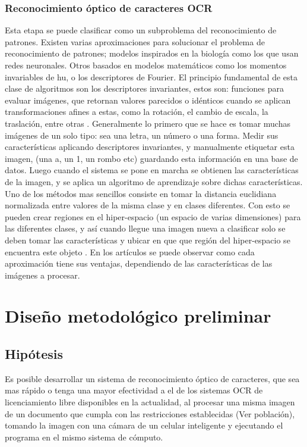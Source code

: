 \documentclass[a4paper, 11pt, oneside]{article}
\begin{document}
	\subsubsection{Reconocimiento óptico de caracteres OCR}
	Esta etapa se puede clasificar como un subproblema del reconocimiento de patrones.\newline
	Existen varias aproximaciones para solucionar el problema de reconocimiento de patrones; 
	modelos inspirados en la biología como los que usan redes neuronales\cite{im_biology}. Otros
	basados en modelos matemáticos como los momentos invariables de hu\cite{art_hu}, o los
	descriptores de Fourier. El principio fundamental de esta clase de algoritmos son
	los descriptores invariantes, estos son: funciones para evaluar imágenes, que retornan valores 
	parecidos o idénticos cuando se aplican	transformaciones afines a estas, como la rotación,
	el cambio de escala, la traslación, entre otras \cite{ocrs1}.\newline	
	Generalmente lo primero que se hace es tomar muchas imágenes de un solo tipo: sea una letra, un 
	número o una forma. Medir sus características aplicando descriptores invariantes, y manualmente 
    etiquetar esta imagen, (una a, un 1, un rombo etc) guardando esta información en una base de
    datos. \newline	
	Luego cuando el sistema se pone en marcha se obtienen las características de la imagen, y se
	aplica un algoritmo de aprendizaje sobre dichas características. Uno de los métodos mas
	sencillos consiste en tomar la distancia euclidiana normalizada entre valores de la misma
	clase y en clases diferentes. Con esto se pueden crear regiones en el hiper-espacio (un
	espacio de varias dimensiones) para las diferentes clases, y así cuando llegue una imagen
	nueva a clasificar solo se deben tomar las características y ubicar en que que región del
	hiper-espacio se encuentra este objeto \cite{learn1}. En los artículos se puede observar como  
	cada aproximación tiene sus ventajas, dependiendo de las características de las imágenes a
	procesar.
	\newpage
		
	\section{Diseño metodológico preliminar}
	
	\subsection{Hipótesis}
	Es posible desarrollar un sistema de reconocimiento óptico de caracteres, que sea mas rápido o
	tenga una mayor efectividad a el de los sistemas OCR de licenciamiento libre disponibles
	en la actualidad, al procesar una misma imagen de un documento que cumpla con las restricciones
	establecidas (Ver población), tomando la imagen con una cámara de un celular inteligente y
	ejecutando el programa en el mismo sistema de cómputo.	
	
\end{document}
